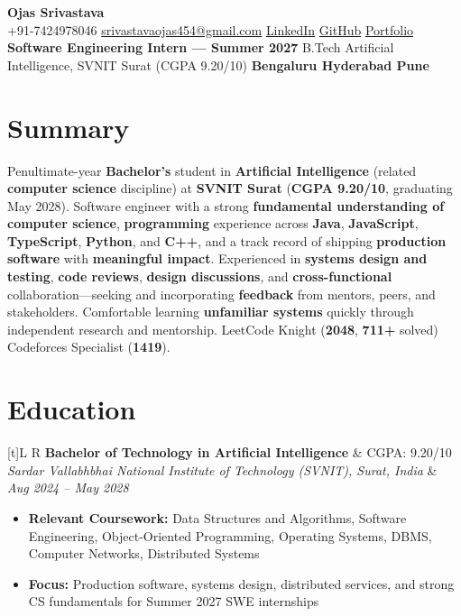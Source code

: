 \documentclass[a4paper,10pt]{article}
\newcommand{\resumeSubheading}[4]{%
  \vspace{0.5mm}
  \noindent
  \begin{tabularx}{\textwidth}[t]{L R}
    \textbf{#1} & #4 \\
    \textit{#3} & \textit{#2} \\
  \end{tabularx}
  \vspace{-0.5mm}%
}
\begin{document}
\selectfont

\begin{center}
  {\LARGE \textbf{Ojas Srivastava}} \\[1mm]
  \small
  +91-7424978046 \textbar{}
  \href{mailto:srivastavaojas454@gmail.com}{srivastavaojas454@gmail.com} \textbar{}
  \href{https://linkedin.com/in/ojas-srivastava05}{LinkedIn} \textbar{}
  \href{https://github.com/Ojas-Srivastava05}{GitHub} \textbar{}
  \href{https://ojas-srivastava.vercel.app}{Portfolio} \\[0.5mm]
  \textbf{Software Engineering Intern --- Summer 2027} \textbar{}
  B.Tech Artificial Intelligence, SVNIT Surat (CGPA 9.20/10) \textbar{}
  \textbf{Bengaluru \textbar{} Hyderabad \textbar{} Pune}
\end{center}

\vspace{-1mm}

\section{Summary}
\small
Penultimate-year \textbf{Bachelor's} student in \textbf{Arti{f}icial Intelligence} (related \textbf{computer science} discipline) at \textbf{SVNIT Surat} (\textbf{CGPA 9.20/10}, graduating May 2028). Software engineer with a strong \textbf{fundamental understanding of computer science}, \textbf{programming} experience across \textbf{Java}, \textbf{JavaScript}, \textbf{TypeScript}, \textbf{Python}, and \textbf{C++}, and a track record of shipping \textbf{production software} with \textbf{meaningful impact}. Experienced in \textbf{systems design and testing}, \textbf{code reviews}, \textbf{design discussions}, and \textbf{cross-functional} collaboration---seeking and incorporating \textbf{feedback} from mentors, peers, and stakeholders. Comfortable learning \textbf{unfamiliar systems} quickly through independent research and mentorship. LeetCode Knight (\textbf{2048}, \textbf{711+} solved) \textbar{} Codeforces Specialist (\textbf{1419}).

\section{Education}
\small
\resumeSubheading
  {Bachelor of Technology in Arti{f}icial Intelligence}{Aug 2024 -- May 2028}
  {Sardar Vallabhbhai National Institute of Technology (SVNIT), Surat, India}{CGPA: 9.20/10}
\begin{itemize}
  \item \textbf{Relevant Coursework:} Data Structures and Algorithms, Software Engineering, Object-Oriented Programming, Operating Systems, DBMS, Computer Networks, Distributed Systems
  \item \textbf{Focus:} Production software, systems design, distributed services, and strong CS fundamentals for Summer 2027 SWE internships
\end{itemize}
\end{document}
